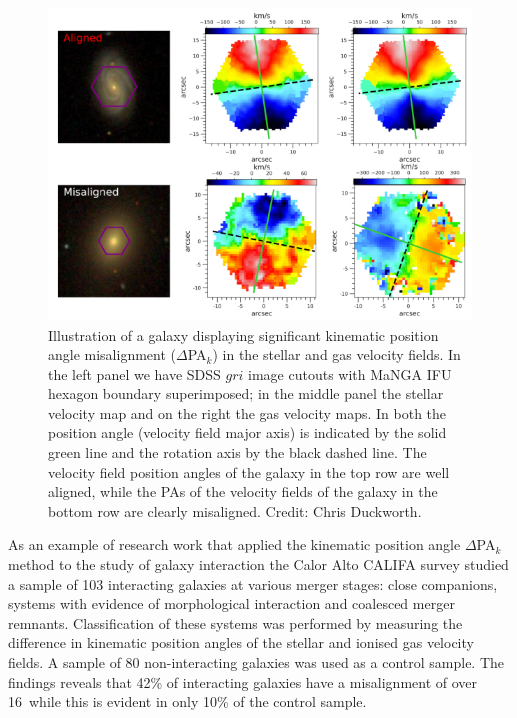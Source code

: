 \begin{figure}
    \centering
    \includegraphics[width=\textwidth]{images/PAplots/Aligned-Misalligned-DeltaPAs.png}
    \caption[Example of kinematic position angle misalignment]{Illustration of a galaxy displaying significant kinematic position angle misalignment ($\Delta$PA$_{k}$) in the stellar and gas velocity fields. In the left panel we have SDSS $gri$ image cutouts with MaNGA IFU hexagon boundary superimposed; in the middle panel the stellar velocity map and on the right the gas velocity maps. In both the position angle (velocity field major axis) is indicated by the solid green line and the rotation axis by the black dashed line. The velocity field position angles of the galaxy in the top row are well aligned, while the PAs of the velocity fields of the galaxy in the bottom row are clearly misaligned. Credit: Chris Duckworth.}
    \label{fig:alligned-misaligned}
\end{figure}

As an example of research work that applied the kinematic position angle $\Delta$PA$_k$ method to the study of galaxy interaction the Calor Alto CALIFA survey \citet{2015A&A...582A..21B} studied a sample of 103 interacting galaxies at various merger stages: close companions, systems with evidence of morphological interaction and coalesced merger remnants. Classification of these systems was performed by measuring the difference in kinematic position angles of the stellar and ionised gas velocity fields. A sample of 80 non-interacting galaxies was used as a control sample. The findings reveals that 42\% of interacting galaxies have a misalignment of over 16\textdegree\ while this is evident in only 10\% of the control sample.

